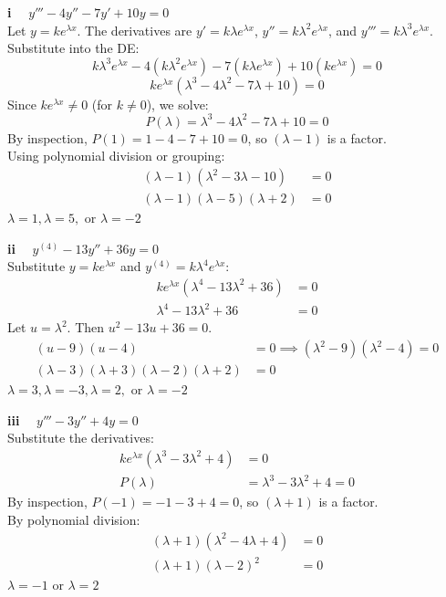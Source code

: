 \begin{solution}
\textbf{i} $\quad y''' - 4y'' - 7y' + 10y = 0$ \\
Let $y = ke^{\lambda x}$. The derivatives are $y' = k\lambda e^{\lambda x}$, $y'' = k\lambda^2 e^{\lambda x}$, and $y''' = k\lambda^3 e^{\lambda x}$. \\
Substitute into the DE:
\[ k\lambda^3 e^{\lambda x} - 4(k\lambda^2 e^{\lambda x}) - 7(k\lambda e^{\lambda x}) + 10(ke^{\lambda x}) = 0 \]
\[ ke^{\lambda x}(\lambda^3 - 4\lambda^2 - 7\lambda + 10) = 0 \]
Since $ke^{\lambda x} \neq 0$ (for $k \neq 0$), we solve:
\[ P(\lambda) = \lambda^3 - 4\lambda^2 - 7\lambda + 10 = 0 \]
By inspection, $P(1) = 1 - 4 - 7 + 10 = 0$, so $(\lambda - 1)$ is a factor. \\
Using polynomial division or grouping:
\begin{align*}
    (\lambda - 1)(\lambda^2 - 3\lambda - 10) &= 0 \\
    (\lambda - 1)(\lambda - 5)(\lambda + 2) &= 0
\end{align*}
\textbf{$\lambda = 1, \lambda = 5, \text{ or } \lambda = -2$}

\vspace{0.3cm}
\textbf{ii} $\quad y^{(4)} - 13y'' + 36y = 0$ \\
Substitute $y = ke^{\lambda x}$ and $y^{(4)} = k\lambda^4 e^{\lambda x}$:
\begin{align*}
    ke^{\lambda x}(\lambda^4 - 13\lambda^2 + 36) &= 0 \\
    \lambda^4 - 13\lambda^2 + 36 &= 0
\end{align*}
Let $u = \lambda^2$. Then $u^2 - 13u + 36 = 0$.
\begin{align*}
    (u - 9)(u - 4) &= 0 \implies (\lambda^2 - 9)(\lambda^2 - 4) = 0 \\
    (\lambda - 3)(\lambda + 3)(\lambda - 2)(\lambda + 2) &= 0
\end{align*}
\textbf{$\lambda = 3, \lambda = -3, \lambda = 2, \text{ or } \lambda = -2$}

\vspace{0.3cm}
\textbf{iii} $\quad y''' - 3y'' + 4y = 0$ \\
Substitute the derivatives:
\begin{align*}
    ke^{\lambda x}(\lambda^3 - 3\lambda^2 + 4) &= 0 \\
    P(\lambda) &= \lambda^3 - 3\lambda^2 + 4 = 0
\end{align*}
By inspection, $P(-1) = -1 - 3 + 4 = 0$, so $(\lambda + 1)$ is a factor. \\
By polynomial division:
\begin{align*}
    (\lambda + 1)(\lambda^2 - 4\lambda + 4) &= 0 \\
    (\lambda + 1)(\lambda - 2)^2 &= 0
\end{align*}
\textbf{$\lambda = -1 \text{ or } \lambda = 2$}


\end{solution}
